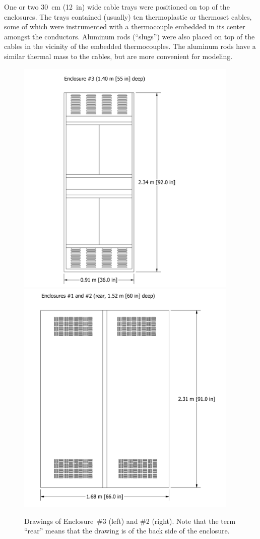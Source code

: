 One or two 30~cm (12~in) wide cable trays were positioned on top of the enclosures. The trays contained (usually) ten thermoplastic or thermoset cables, some of which were instrumented with a thermocouple embedded in its center amongst the conductors. Aluminum rods (``slugs'') were also placed on top of the cables in the vicinity of the embedded thermocouples. The aluminum rods have a similar thermal mass to the cables, but are more convenient for modeling.
\begin{figure}[!ht]
\hspace*{-0.75in}\includegraphics[height=4.5in]{../FIGURES/Cabinet_3}
\hspace*{-1.25in}\includegraphics[height=4.5in]{../FIGURES/Cabinet_1}
\caption[Drawings of Enclosures \#2 and \#3]{Drawings of Enclosure~\#3 (left) and \#2 (right). Note that the term ``rear'' means that the drawing is of the back side of the enclosure.}
\label{fig:enclosure_drawings}
\end{figure}
